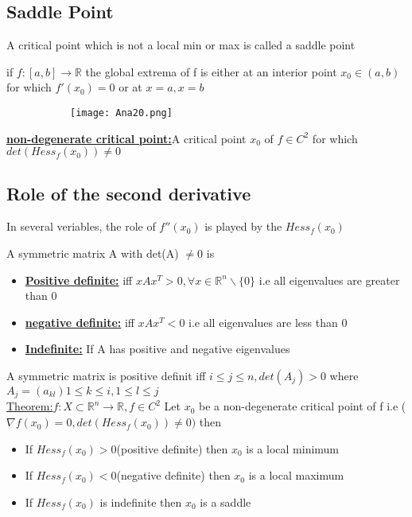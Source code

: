 \documentclass[8pt]{extreport}
\newcommand{\R}{\mathbb{R}}
\begin{document}
\subsection{Saddle Point}
A critical point which is not a local min or max is called a saddle point

if $f:[a,b] \to \R$ the global extrema of f is either at an interior point $x_0 \in (a,b)$ for which $f'(x_0)=0$ or at $x=a,x=b$
\begin{figure}[H]
\centering
\begin{subfigure}[b]{0.4\linewidth}
\texttt{[image: Ana20.png]}
\end{subfigure}
\end{figure}

\underline{\textbf{ non-degenerate critical point:}}A critical point $x_0$ of $f\in C^2$  for which $det(Hess_f(x_0)) \neq 0$\\

\subsection{Role of the second derivative}
 
In several veriables, the role of $f''(x_0)$ is played by the $Hess_f(x_0)$

A symmetric matrix A with det(A) $\neq 0$ is
\begin{itemize}
\item \underline{\textbf{Positive definite:}} iff $xAx^T >0, \forall x \in \R^n\backslash \{0\}$ i.e all eigenvalues are greater than 0
\item \underline{\textbf{negative definite:}} iff $xAx^T < 0$ i.e all eigenvalues are less than 0
\item  \underline{\textbf{Indefinite:}} If A has positive and negative eigenvalues
\end{itemize}

A symmetric matrix is positive definit iff $i \leq j \leq n, det (A_j) >0$ where $A_j = (a_{kl}) 1 \leq k \leq i, 1 \leq l \leq j$\\

\underline{Theorem:}$f:X\subset \R^n \rightarrow \R, f \in C^2$ Let $x_0$ be a non-degenerate critical point of f i.e ($\nabla f(x_0) = 0, det(Hess_f(x_0)) \neq 0)$ then
\begin{itemize}
\item If $Hess_f(x_0) >0$(positive definite) then $x_0$ is a local minimum
\item If $Hess_f(x_0) <0$(negative definite) then $x_0$ is a local maximum
\item If $Hess_f(x_0)$ is indefinite then $x_0$ is a saddle
\end{itemize}
\end{document}
